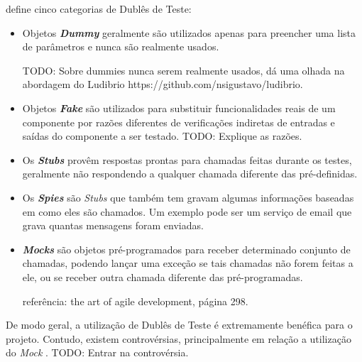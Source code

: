  define cinco categorias de Dublês de Teste:

\begin{itemize}
\item
Objetos \textbf{\textit{Dummy}} geralmente são utilizados apenas para preencher uma lista de parâmetros e nunca são realmente usados.

TODO: Sobre dummies nunca serem realmente usados, dá uma olhada na abordagem do Ludibrio https://github.com/nsigustavo/ludibrio.

\item
Objetos \textbf{\textit{Fake}} são utilizados para substituir funcionalidades reais de um componente por razões diferentes de verificações indiretas de entradas e saídas do componente a ser testado. TODO: Explique as razões.

\item
Os \textbf{\textit{Stubs}} provêm respostas prontas para chamadas feitas durante os testes, geralmente não respondendo a qualquer   chamada diferente
das pré-definidas.

\item
Os \textbf{\textit{Spies}} são \textit{Stubs} que também tem gravam algumas informações baseadas em como eles são chamados. Um exemplo   pode ser um serviço de email que grava quantas mensagens foram   enviadas.

\item
\textbf{\textit{Mocks}} são objetos pré-programados para receber determinado conjunto de chamadas, podendo lançar uma exceção se tais chamadas não forem feitas a ele, ou se receber outra chamada diferente das pré-programadas.

referência: the art of agile development, página 298.
\end{itemize}

De modo geral, a utilização de Dublês de Teste é extremamente benéfica para o projeto. Contudo, existem controvérsias, principalmente em relação a utilização do \textit{Mock} \cite{MocksArentStubs}. TODO: Entrar na controvérsia.



